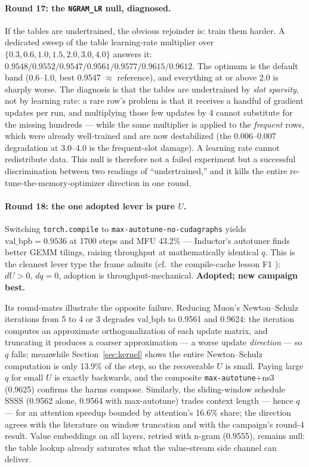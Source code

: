 \documentclass{article}
\newcommand{\valbpb}{\mathrm{val\_bpb}}
\begin{document}
\paragraph{Round 17: the \texttt{NGRAM\_LR} null, diagnosed.}
If the tables are undertrained, the obvious rejoinder is: train them harder. A dedicated sweep of the table learning-rate multiplier over $\{0.3, 0.6, 1.0, 1.5, 2.0, 3.0, 4.0\}$ answers it: $0.9548/0.9552/0.9547/0.9561/0.9577/0.9615/0.9612$. The optimum is the default band (0.6--1.0, best 0.9547 $\approx$ reference), and everything at or above 2.0 is sharply worse. The diagnosis is that the tables are undertrained by \emph{slot sparsity}, not by learning rate: a rare row's problem is that it receives a handful of gradient updates per run, and multiplying those few updates by 4 cannot substitute for the missing hundreds --- while the same multiplier is applied to the \emph{frequent} rows, which were already well-trained and are now destabilized (the 0.006--0.007 degradation at 3.0--4.0 is the frequent-slot damage). A learning rate cannot redistribute data. This null is therefore not a failed experiment but a successful discrimination between two readings of ``undertrained,'' and it kills the entire re-tune-the-memory-optimizer direction in one round.

\paragraph{Round 18: the one adopted lever is pure $U$.}
Switching \texttt{torch.compile} to \texttt{max-autotune-no-cudagraphs} yields $\valbpb = 0.9536$ at 1700 steps and MFU 43.2\% --- Inductor's autotuner finds better GEMM tilings, raising throughput at mathematically identical $q$. This is the cleanest lever type the frame admits (cf.\ the compile-cache lesson F1 \cite{ophis2026paper001}): $dU > 0$, $dq = 0$, adoption is throughput-mechanical. \textbf{Adopted; new campaign best.}

Its round-mates illustrate the opposite failure. Reducing Muon's Newton--Schulz iterations from 5 to 4 or 3 degrades $\valbpb$ to 0.9561 and 0.9624: the iteration computes an approximate orthogonalization of each update matrix, and truncating it produces a coarser approximation --- a worse update \emph{direction} --- so $q$ falls; meanwhile Section~\ref{sec:kernel} shows the entire Newton--Schulz computation is only 13.9\% of the step, so the recoverable $U$ is small. Paying large $q$ for small $U$ is exactly backwards, and the composite \texttt{max-autotune}+ns3 (0.9625) confirms the harms compose. Similarly, the sliding-window schedule SSSS (0.9562 alone, 0.9564 with max-autotune) trades context length --- hence $q$ --- for an attention speedup bounded by attention's 16.6\% share; the direction agrees with the literature on window truncation \cite{beltagy2020longformer} and with the campaign's round-4 result. Value embeddings on all layers, retried with n-gram (0.9555), remains null: the table lookup already saturates what the value-stream side channel can deliver.
\end{document}
